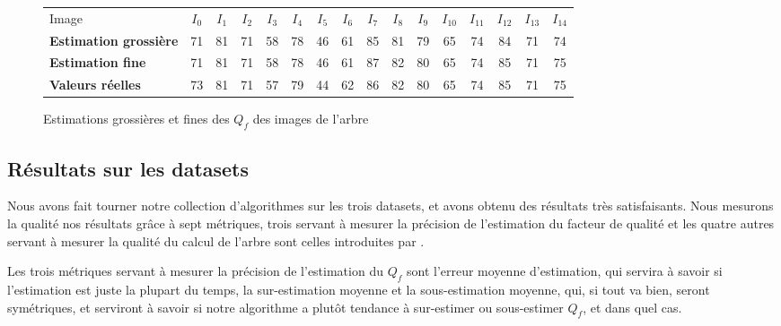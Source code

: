 \documentclass[utf8,final]{stageM2R} %
\begin{document}
\begin{figure}
  \begin{tabular}{|l||c|c|c|c|c|c|c|c|c|c|c|c|c|c|c|}
    \hline
      Image & $I_{0}$ & $I_{1}$ & $I_{2}$ & $I_{3}$ & $I_{4}$ & $I_{5}$ & $I_{6}$ & $I_{7}$ & $I_{8}$ & $I_{9}$ & $I_{10}$ & $I_{11}$ & $I_{12}$ & $I_{13}$ & $I_{14}$ \\ \hhline{|=::=|=|=|=|=|=|=|=|=|=|=|=|=|=|=|}
   
    \textbf{Estimation grossière}  & 71 & 81 & 71 & 58 & 78 & 46 & 61 & 85 & 81 & 79 & 65 & 74 & 84 & 71 & 74 \\ \hline
    \textbf{Estimation fine} & 71 & 81 & 71 & 58 & 78 & 46 & 61 & 87 & 82 & 80 & 65 & 74 & 85 & 71 & 75 \\ \hline
    \textbf{Valeurs réelles} & 73 & 81 & 71 & 57 & 79 & 44 & 62 & 86 & 82 & 80 & 65 & 74 & 85 & 71 & 75 \\ \hline
  \end{tabular}

  \caption{Estimations grossières et fines des $Q_f$ des images de l'arbre}
  \label{rough_fine}
\end{figure}

\subsection{Résultats sur les datasets}
Nous avons fait tourner notre collection d'algorithmes sur les trois datasets, et avons obtenu des résultats très satisfaisants. Nous mesurons la qualité nos résultats grâce à sept métriques, trois servant à mesurer la précision de l'estimation du facteur de qualité et les quatre autres servant à mesurer la qualité du calcul de l'arbre sont celles introduites par  \cite{dias2012image}.

Les trois métriques servant à mesurer la précision de l'estimation du $Q_f$ sont l'erreur moyenne d'estimation, qui servira à savoir si l'estimation est juste la plupart du temps, la sur-estimation moyenne et la sous-estimation moyenne, qui, si tout va bien, seront symétriques, et serviront à savoir si notre algorithme a plutôt tendance à sur-estimer ou sous-estimer $Q_f$, et dans quel cas.
\end{document}
